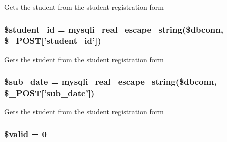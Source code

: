 \-Gets the student from the student registration form \hypertarget{admin__view_2validate_2studentVal_8php_a70806170d1b60ef7fb76db46f2bce5e3}{
\subsubsection[{\$student\-\_\-id}]{\setlength{\rightskip}{0pt plus 5cm}\$student\-\_\-id = mysqli\-\_\-real\-\_\-escape\-\_\-string(\$dbconn, \$\-\_\-\-P\-O\-S\-T\mbox{[}'student\-\_\-id'\mbox{]})}}\label{admin__view_2validate_2studentVal_8php_a70806170d1b60ef7fb76db46f2bce5e3}
\-Gets the student from the student registration form \hypertarget{admin__view_2validate_2studentVal_8php_a08dd3f8caa6a5a9037559298cfd9e5cc}{
\subsubsection[{\$sub\-\_\-date}]{\setlength{\rightskip}{0pt plus 5cm}\$sub\-\_\-date = mysqli\-\_\-real\-\_\-escape\-\_\-string(\$dbconn, \$\-\_\-\-P\-O\-S\-T\mbox{[}'sub\-\_\-date'\mbox{]})}}\label{admin__view_2validate_2studentVal_8php_a08dd3f8caa6a5a9037559298cfd9e5cc}
\-Gets the student from the student registration form \hypertarget{admin__view_2validate_2studentVal_8php_a0587674d27d00ef497e08e53ccf45bbb}{
\subsubsection[{\$valid}]{\setlength{\rightskip}{0pt plus 5cm}\$valid = 0}}\label{admin__view_2validate_2studentVal_8php_a0587674d27d00ef497e08e53ccf45bbb}
